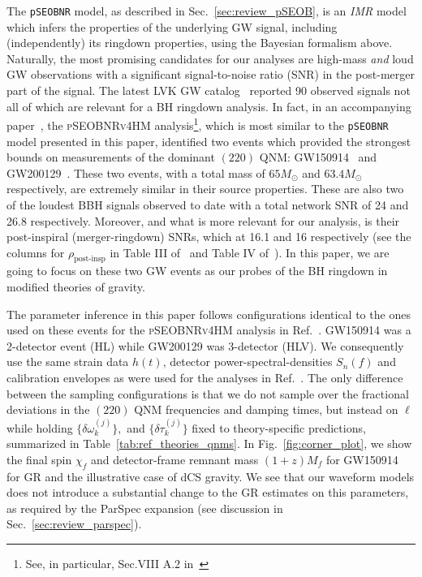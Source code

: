 \documentclass[twocolumn,
               prd,
               aps,
               superscriptaddress,
               tightenlines,
               nofootinbib,
               eqsecnum,
               amsfonts,
               amsmath,
               longbibliography]{revtex4-1}
\newcommand{\Mo}{M_{\odot}}
\newcommand{\pSEOB}{\texttt{pSEOBNR}}
\begin{document}
The \pSEOB{} model, as described in Sec.~\ref{sec:review_pSEOB}, is an
\emph{IMR} model which infers the properties of the underlying GW signal,
including (independently) its ringdown properties, using the Bayesian formalism
above. Naturally, the most promising candidates for our analyses are high-mass
\emph{and} loud GW observations with a significant signal-to-noise ratio (SNR)
in the post-merger part of the signal.
%
The latest LVK GW catalog~\cite{LIGOScientific:2021djp} reported 90 observed
signals not all of which are relevant for a BH ringdown analysis. In fact, in
an accompanying paper~\cite{LIGOScientific:2021sio}, the \textsc{pSEOBNRv4HM}
analysis\footnote{See, in particular, Sec.VIII A.2
in~\cite{LIGOScientific:2021sio}}, which is most similar to the \pSEOB{} model
presented in this paper, identified two events which provided the strongest
bounds on measurements of the dominant $(220)$ QNM:
GW150914~\cite{LIGOScientific:2016aoc} and
GW200129~\cite{LIGOScientific:2021djp}.
%
These two events, with a total mass of $65 \Mo$ and $63.4 \Mo$ respectively, are
extremely similar in their source properties. These are also two of the loudest
BBH signals observed to date with a total network SNR of 24 and 26.8
respectively.
%
Moreover, and what is more relevant for our analysis, is their post-inspiral
(merger-ringdown) SNRs, which at 16.1 and 16 respectively (see the columns for
$\rho_{\text{post-insp}}$ in Table III of~\cite{LIGOScientific:2019fpa} and
Table IV of~\cite{LIGOScientific:2021sio}).
%
In this paper, we are going to focus on these two GW events as our probes of
the BH ringdown in modified theories of gravity.

The parameter inference in this paper follows configurations identical to the
ones used on these events for the \textsc{pSEOBNRv4HM} analysis in
Ref.~\cite{LIGOScientific:2021sio}. GW150914 was a 2-detector event (HL) while
GW200129 was 3-detector (HLV).
%
We consequently use the same strain data $h(t)$, detector
power-spectral-densities $S_n(f)$ and calibration envelopes as were used for
the analyses in Ref.~\cite{LIGOScientific:2021sio}.
%
The only difference between the sampling configurations is that we do not
sample over the fractional deviations in the $(220)$ QNM frequencies and
damping times, but instead on $\ell$ while holding $\{\delta \omega_k^{(j)}\},$
and $\{\delta \tau_k^{(j)}\}$ fixed to theory-specific predictions, summarized
in Table~\ref{tab:ref_theories_qnms}.
%
In Fig.~\ref{fig:corner_plot}, we show the final spin $\chi_f$ and
detector-frame remnant mass $(1 + z) M_f$ for GW150914 for GR and the
illustrative case of dCS gravity. We see that our waveform models does not
introduce a substantial change to the GR estimates on this parameters, as
required by the ParSpec expansion (see discussion in
Sec.~\ref{sec:review_parspec}).
\end{document}
